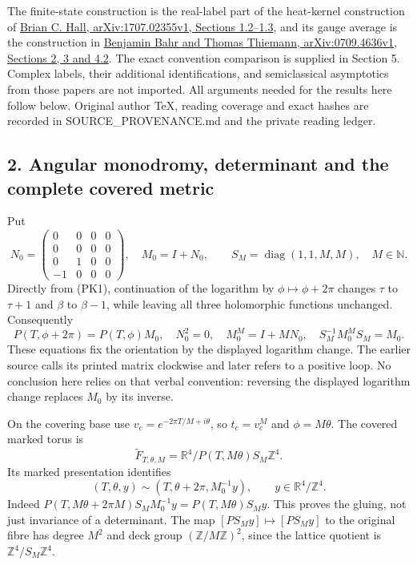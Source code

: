 \documentclass[11pt]{article}
\begin{document}
The finite-state construction is the real-label part of the heat-kernel
construction of \href{https://arxiv.org/abs/1707.02355v1}{Brian C. Hall, arXiv:1707.02355v1, Sections 1.2–1.3},
and its gauge average is the construction in
\href{https://arxiv.org/abs/0709.4636v1}{Benjamin Bahr and Thomas Thiemann, arXiv:0709.4636v1, Sections 2, 3 and 4.2}.
The exact convention comparison is supplied in Section 5. Complex labels,
their additional identifications, and semiclassical asymptotics from those
papers are not imported. All arguments needed for the results here follow
below. Original author TeX, reading coverage and exact hashes are recorded
in SOURCE\_PROVENANCE.md and the private reading ledger.

\subsection*{2. Angular monodromy, determinant and the complete covered metric}

Put
\[
 N_0=\begin{pmatrix}0&0&0&0\\0&0&0&0\\0&1&0&0\\-1&0&0&0\end{pmatrix},
 \quad M_0=I+N_0,\qquad S_M=\operatorname{diag}(1,1,M,M),\quad M\in\mathbb N.
 \tag{PK3}
\]
Directly from (PK1), continuation of the logarithm by
\(\phi\mapsto\phi+2\pi\) changes \(\tau\) to \(\tau+1\) and
\(\beta\) to \(\beta-1\), while leaving all three holomorphic functions
unchanged. Consequently
\[
 P(T,\phi+2\pi)=P(T,\phi)M_0,\quad N_0^2=0,\quad
 M_0^M=I+MN_0,\quad S_M^{-1}M_0^MS_M=M_0.
 \tag{PK4}
\]
These equations fix the orientation by the displayed logarithm change.
The earlier source calls its printed matrix clockwise and later refers to
a positive loop. No conclusion here relies on that verbal convention:
reversing the displayed logarithm change replaces \(M_0\) by its inverse.

On the covering base use
\(v_c=e^{-2\pi T/M+i\theta}\), so \(t_c=v_c^M\) and
\(\phi=M\theta\). The covered marked torus is
\[
 \widetilde F_{T,\theta,M}=\mathbb R^4/P(T,M\theta)S_M\mathbb Z^4.
 \tag{PK5}
\]
Its marked presentation identifies
\[
 (T,\theta,y)\sim(T,\theta+2\pi,M_0^{-1}y),\qquad
 y\in\mathbb R^4/\mathbb Z^4.
 \tag{PK6}
\]
Indeed \(P(T,M\theta+2\pi M)S_MM_0^{-1}y=P(T,M\theta)S_My\).
This proves the gluing, not just invariance of a determinant. The map
\([P S_My]\mapsto[P S_My]\) to the original fibre has degree \(M^2\)
and deck group \((\mathbb Z/M\mathbb Z)^2\), since the lattice quotient
is \(\mathbb Z^4/S_M\mathbb Z^4\).
\end{document}
